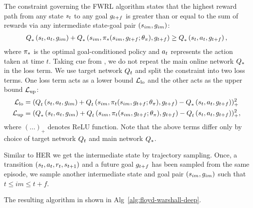 The constraint governing the FWRL algorithm states that the highest reward path
from any state $\state_t$ to any goal $\goal_{t+f}$ is greater than or equal to
the sum of rewards via any intermediate state-goal pair $(\state_{im}, \goal_{im})$:
%
\begin{align}
      \fwargs{\state_{t}}{\act_t}{\goal_{im}}{*}{}
      + \fwargs{\state_{im}}{\policy_*(\state_{im}, \goal_{t+f};\param_\policy)}{\goal_{t+f}}{*}{}
      \ge \fwargs{\state_{t}}{\act_t}{\goal_{t+f}}{*}{},
\end{align}%
% 
where $\policy_*$ is the optimal goal-conditioned policy and $\act_t$ represents
the action taken at time $t$. Taking cue from \citet{MnKaSiNATURE2015}, we do
not repeat the main online network $\Q_*$ in the loss term. We use target
network $\Q_t$ and split the constraint into two loss terms. One loss term acts
as a lower bound $\LossLo$ and the other acts as the upper bound $\LossUp$:
%
\begin{align}
  \LossLo &= (
      \fwargs{\state_{t}}{\act_t}{\goal_{im}}{t}{}
      + \fwargs{\state_{im}}{\policy_t(\state_{im}, \goal_{t+f};\param_\policy)}{\goal_{t+f}}{t}{}
      - \fwargs{\state_{t}}{\act_t}{\goal_{t+f}}{*}{}
      )_+^2
                         \\
  \LossUp &= (
      \fwargs{\state_{t}}{\act_t}{\goal_{im}}{*}{}
      + \fwargs{\state_{im}}{\policy_t(\state_{im}, \goal_{t+f};\param_\policy)}{\goal_{t+f}}{t}{}
      - \fwargs{\state_{t}}{\act_t}{\goal_{t+f}}{t}{}
      )_+^2,
\end{align}%
% 
where $(\dots)_+$ denotes ReLU function.
Note that the above terms differ only by choice of target network $\fw_t$ and
main network $\fw_*$. 

Similar to HER we get the intermediate state by trajectory sampling. Once,
a transition $(\state_t, \act_t, \rew_t, \state_{t+1})$ and a future goal
$\goal_{t+f}$ has been sampled from the same episode, we sample another
intermediate state and goal pair $(\state_{im}, \goal_{im})$ such that $t \le im
\le t + f$.
% 

The resulting algorithm in shown in Alg~\ref{alg:floyd-warshall-deep}.


